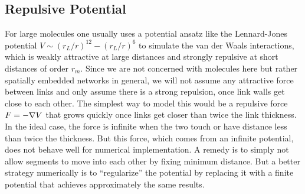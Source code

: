 \documentclass[nofootinbib,preprint,floatfix,titlepage,superscriptaddress]{revtex4} %
\begin{document}
\subsection{Repulsive Potential\label{ap:repel}}

For large molecules one usually uses a potential ansatz like the Lennard-Jones potential $V \sim (r_L/r)^{12} - (r_L/r)^6 $ to simulate the van der Waals interactions, which is weakly attractive at large distances and strongly repulsive at short distances of order $r_m$. Since we are not concerned with molecules here but rather spatially embedded networks in general, we will not assume any attractive force between links and only assume there is a strong repulsion, once link walls get close to each other. The simplest way to model this would be a repulsive force $F = -\nabla V$ that grows quickly once links get closer than twice the link thickness. In the ideal case, the force is infinite when the two touch or have distance less than twice the thickness. But this force, which comes from an infinite potential, does not behave well for numerical implementation. A remedy is to simply not allow segments to move into each other by fixing minimum distance. But a better strategy numerically is to ``regularize'' the potential by replacing it with a finite potential that achieves approximately the same results. 
\end{document}
